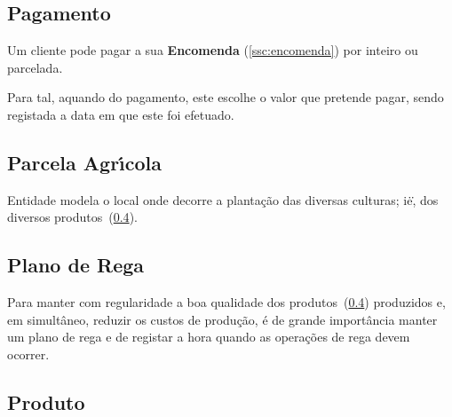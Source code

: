 \documentclass[12pt, a4paper]{article}
\begin{document}

\subsection{Pagamento}\label{ssc:pagamento}

Um cliente pode pagar a sua \textbf{Encomenda} (\ref{ssc:encomenda})
por inteiro ou parcelada.

Para tal, aquando do pagamento, este escolhe o valor que pretende pagar,
sendo registada a data em que este foi efetuado.



\subsection{Parcela Agr\'{\i}cola}\label{ssc:parcela_agr}

Entidade modela o local onde decorre a planta\c{c}\~ao das diversas culturas;
i\.e\., dos diversos produtos~(\ref{ssc:prod}).


\subsection{Plano de Rega}\label{ssc:plano_rega}

Para manter com regularidade a boa qualidade dos produtos~(\ref{ssc:prod}) produzidos e,
em simult\^aneo, reduzir os custos de produ\c{c}\~ao, \'e de grande import\^ancia manter
um plano de rega e de registar a hora quando as opera\c{c}\~oes de rega devem ocorrer.


\subsection{Produto}\label{ssc:prod}
\end{document}
